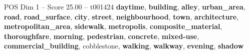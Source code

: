 \begin{textsample}{POS Dim 1 – Score 25.00 – t001424}  \label{ex:f1_pos_007}
\textbf{daytime}, \textbf{building}, \textbf{alley}, \textbf{urban\_area}, \textbf{road}, \textbf{road\_surface}, \textbf{city}, \textbf{street}, \textbf{neighbourhood}, \textbf{town}, \textbf{architecture}, \textbf{metropolitan\_area}, \textbf{sidewalk}, \textbf{metropolis}, \textbf{composite\_material}, \textbf{thoroughfare}, \textbf{morning}, \textbf{pedestrian}, \textbf{concrete}, \textbf{mixed-use}, \textbf{commercial\_building}, cobblestone, \textbf{walking}, \textbf{walkway}, \textbf{evening}, \textbf{shadow}

\end{textsample}

